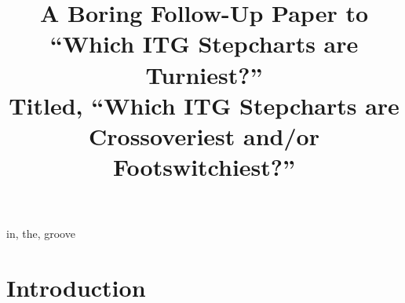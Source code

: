 \documentclass[10pt]{sigplanconf}
\begin{document}
\copyrightdata{}


\title{
A Boring Follow-Up Paper to \\
``Which ITG Stepcharts are Turniest?'' \\
Titled, ``Which ITG Stepcharts are Crossoveriest and/or Footswitchiest?'' \\
}


\maketitle

\begin{abstract}


\end{abstract}


\keywords
in, the, groove


\section{Introduction}
\end{document}
